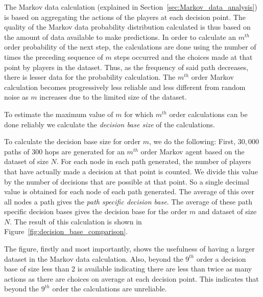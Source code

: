 The Markov data calculation (explained in Section~\ref{sec:Markov_data_analysis}) is based on aggregating the actions of the players at each decision point. The quality of the Markov data probability distribution calculated is thus based on the amount of data available to make predictions. In order to calculate an $m^{th}$ order probability of the next step, the calculations are done using the number of times the preceding sequence of $m$ steps occurred and the choices made at that point by players in the dataset. Thus, as the frequency of said path decreases, there is lesser data for the probability calculation. The $m^{th}$ order Markov calculation becomes progressively less reliable and less different from random noise as $m$ increases due to the limited size of the dataset.

To estimate the maximum value of $m$ for which $m^{th}$ order calculations can be done reliably we calculate the \emph{decision base size} of the calculations.

To calculate the decision base size for order $m$, we do the following: First, $30,000$ paths of $300$ hops are generated for an $m^{th}$ order Markov agent based on the dataset of size $N$. For each node in each path generated, the number of players that have actually made a decision at that point is counted. We divide this value by the number of decisions that are possible at that point. So a single decimal value is obtained for each node of each path generated. The average of this over all nodes a path gives the \emph{path specific decision base}.  The average of these path specific decision bases gives the decision base for the order $m$ and dataset of size $N$. The result of this calculation is shown in Figure~\ref{fig:decision_base_comparison}.

The figure, firstly and most importantly, shows the usefulness of having a larger dataset in the Markov data calculation. Also, beyond the $9^{th}$ order a decision base of size less than 2 is available indicating there are less than twice as many actions as there are choices on average at each decision point. This indicates that beyond the $9^{th}$ order the calculations are unreliable.



